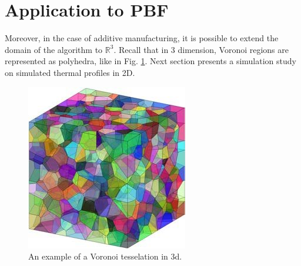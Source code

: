 
\section{Application to PBF}
\label{sec:PBFApp}
Moreover, in the case of additive manufacturing, it is possible to extend the domain of the algorithm to $\mathbb{R}^3$. Recall that in 3 dimension, Voronoi regions are represented as polyhedra, like in Fig. \ref{fig:3dvoronoi}. Next section presents a simulation study on simulated thermal profiles in 2D. 
\begin{figure}
    \centering
    \includegraphics[scale=0.43]{Images/3D-Voronoi-tessellation-with-1000-grains-unit-cell-with-its-internal-grains-not.png}
   \caption[3d Voronoi tessellation.]{An example of a Voronoi tesselation in 3d.}
    \label{fig:3dvoronoi}
\end{figure}

